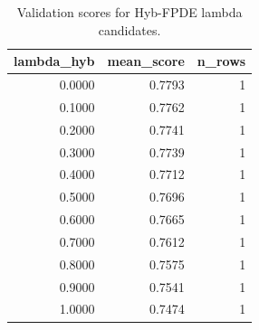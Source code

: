 \begin{table}[t]
\caption{Validation scores for Hyb-FPDE lambda candidates.}
\label{tab:lambda_distribution_computed}
\centering
\begin{tabular}{rrr}
\toprule
lambda\_hyb & mean\_score & n\_rows \\
\midrule
0.0000 & 0.7793 & 1 \\
0.1000 & 0.7762 & 1 \\
0.2000 & 0.7741 & 1 \\
0.3000 & 0.7739 & 1 \\
0.4000 & 0.7712 & 1 \\
0.5000 & 0.7696 & 1 \\
0.6000 & 0.7665 & 1 \\
0.7000 & 0.7612 & 1 \\
0.8000 & 0.7575 & 1 \\
0.9000 & 0.7541 & 1 \\
1.0000 & 0.7474 & 1 \\
\bottomrule
\end{tabular}

\end{table}
